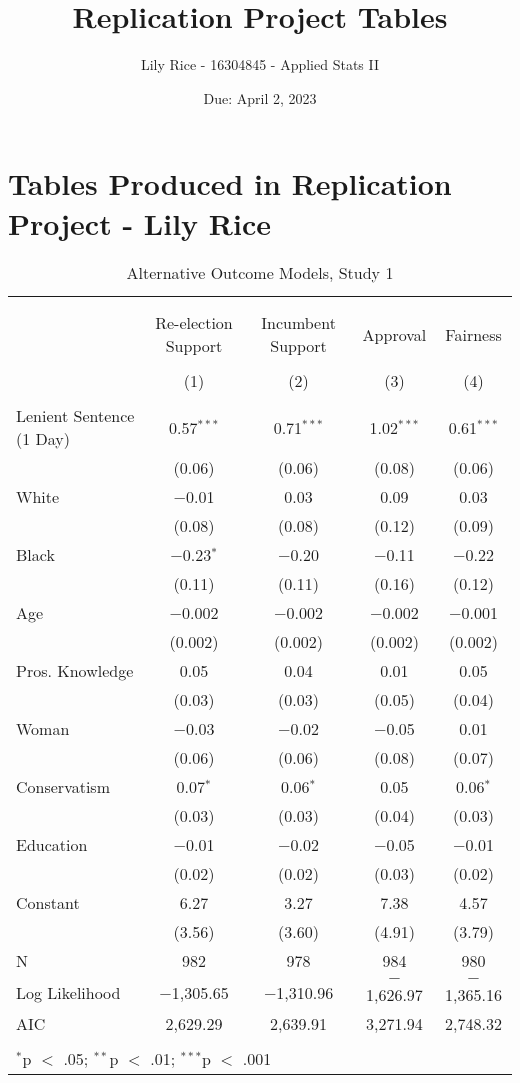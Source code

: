 \documentclass[12pt,letterpaper]{article}
\title{Replication Project Tables}
\date{Due: April 2, 2023}
\author{Lily Rice - 16304845 - Applied Stats II}
\begin{document}
	\maketitle
	\section*{Tables Produced in Replication Project - Lily Rice}








\begin{table}[!htbp] \centering   \caption{Alternative Outcome Models, Study 1}   \label{} \begin{tabular}{@{\extracolsep{5pt}}lcccc} \\[-1.8ex]\hline \\[-1.8ex] \\[-1.8ex] & Re-election Support & Incumbent Support & Approval & Fairness \\ \\[-1.8ex] & (1) & (2) & (3) & (4)\\ \hline \\[-1.8ex]  Lenient Sentence (1 Day) & 0.57$^{***}$ & 0.71$^{***}$ & 1.02$^{***}$ & 0.61$^{***}$ \\   & (0.06) & (0.06) & (0.08) & (0.06) \\   White & $-$0.01 & 0.03 & 0.09 & 0.03 \\   & (0.08) & (0.08) & (0.12) & (0.09) \\   Black & $-$0.23$^{*}$ & $-$0.20 & $-$0.11 & $-$0.22 \\   & (0.11) & (0.11) & (0.16) & (0.12) \\   Age & $-$0.002 & $-$0.002 & $-$0.002 & $-$0.001 \\   & (0.002) & (0.002) & (0.002) & (0.002) \\   Pros. Knowledge & 0.05 & 0.04 & 0.01 & 0.05 \\   & (0.03) & (0.03) & (0.05) & (0.04) \\   Woman & $-$0.03 & $-$0.02 & $-$0.05 & 0.01 \\   & (0.06) & (0.06) & (0.08) & (0.07) \\   Conservatism & 0.07$^{*}$ & 0.06$^{*}$ & 0.05 & 0.06$^{*}$ \\   & (0.03) & (0.03) & (0.04) & (0.03) \\   Education & $-$0.01 & $-$0.02 & $-$0.05 & $-$0.01 \\   & (0.02) & (0.02) & (0.03) & (0.02) \\   Constant & 6.27 & 3.27 & 7.38 & 4.57 \\   & (3.56) & (3.60) & (4.91) & (3.79) \\  N & 982 & 978 & 984 & 980 \\ Log Likelihood & $-$1,305.65 & $-$1,310.96 & $-$1,626.97 & $-$1,365.16 \\ AIC & 2,629.29 & 2,639.91 & 3,271.94 & 2,748.32 \\ \hline \\[-1.8ex] \multicolumn{5}{l}{$^{*}$p $<$ .05; $^{**}$p $<$ .01; $^{***}$p $<$ .001} \\ \end{tabular} \end{table} 


	
\end{document}
